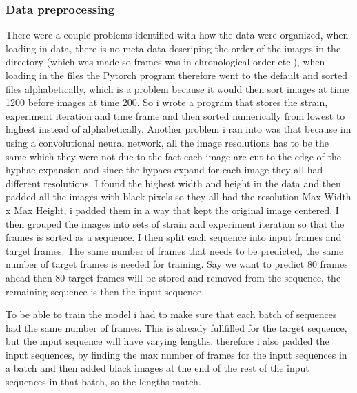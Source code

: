 \documentclass[a4paper,12pt]{article}
\begin{document}
\subsubsection{Data preprocessing}
There were a couple problems identified with how the data were organized, when loading in data, there is no meta data descriping the order of the images in the directory (which was made so frames was in chronological order etc.), when loading in the files the Pytorch program therefore went to the default and sorted files alphabetically, which is a problem because it would then sort images at time 1200 before images at time 200. 
So i wrote a program that stores the strain, experiment iteration and time frame and then sorted numerically from lowest to highest instead of alphabetically. Another problem i ran into was that because im using a convolutional neural network, all the image resolutions has to be the same which they were not due to the fact each image are cut to the edge of the hyphae expansion and since the hypaes expand for each image they all had different resolutions.
 I found the highest width and height in the data and then padded all the images with black pixels so they all had the resolution Max Width x Max Height, i padded them in a way that kept the original image centered. I then grouped the images into sets of strain and experiment iteration so that the frames is sorted as a sequence. 
 I then split each sequence into input frames and target frames. The same number of frames that needs to be predicted, the same number of target frames is needed for training. Say we want to predict $80$ frames ahead then $80$ target frames will be stored and removed from the sequence, the remaining sequence is then the input sequence.

 To be able to train the model i had to make sure that each batch of sequences had the same number of frames. This is already fullfilled for the target sequence, but the input sequence will have varying lengths. therefore i also padded the input sequences, by finding the max number of frames for the input sequences in a batch and then added black images at the end of the rest of the input sequences in that batch, so the lengths match.
\end{document}

